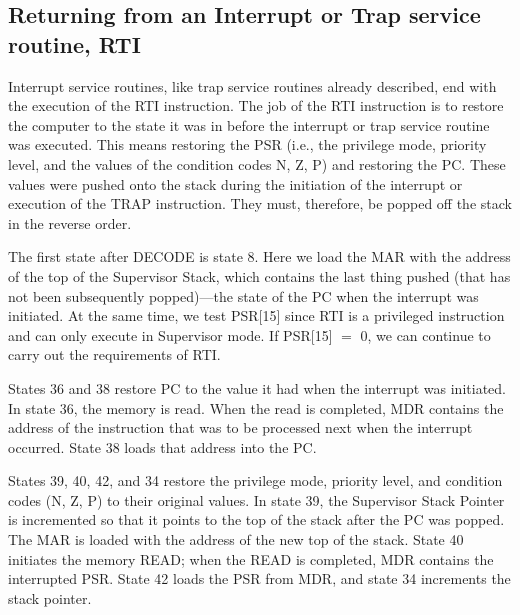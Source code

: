 \documentclass{patt}
\begin{document}
\subsection{Returning from an Interrupt or Trap service routine, RTI}

Interrupt service routines, like trap service routines already described,
end with the execution of the RTI
instruction.  The job of the RTI instruction is to restore the
computer to the state it was in before the interrupt or trap service routine
was executed.  This means restoring the PSR (i.e., the privilege mode, priority
level, and the values of the condition codes N, Z, P) and restoring
the PC.  These values were pushed onto the stack during
the initiation of the interrupt or execution of the TRAP instruction.  
They must, therefore, be popped off the stack in the reverse order.

The first state after DECODE is state 8.  Here we load the MAR with
the address of the top of the Supervisor Stack, which contains the
last thing pushed (that has not been subsequently popped)---the state
of the PC when the interrupt was initiated.  At the same time, we test
PSR[15] since RTI is a privileged instruction and can only execute in
Supervisor mode.  If PSR[15] $=$ 0, we can continue to carry out the
requirements of RTI.

States 36 and 38 restore PC to the value it had when the interrupt was 
initiated.
In state 36, the memory is read.  When the read is completed, MDR
contains the address of the instruction that was to be processed next
when the interrupt occurred.  State 38 loads that address into the PC.

States 39, 40, 42, and 34 restore the privilege mode, priority level,
and condition codes (N, Z, P) to their original values.  In state 39, the
Supervisor Stack Pointer is incremented so that it points to the top
of the stack after the PC was popped.  The MAR is loaded with the
address of the new top of the stack.  State 40 initiates the memory
READ; when the READ is completed, MDR contains the interrupted PSR.
State 42 loads the PSR from MDR, and state 34 increments the stack
pointer.
\end{document}
